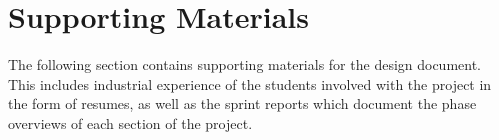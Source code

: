 
\chapter{Supporting Materials}
The following section contains supporting materials for the design document. This includes industrial experience of the students involved with the project in the form of resumes, as well as the sprint reports which document the phase overviews of each section of the project. 